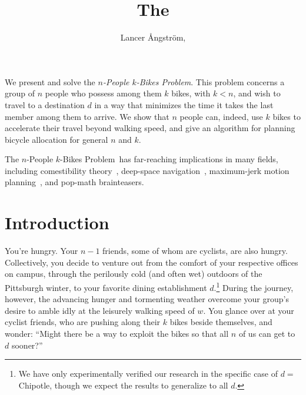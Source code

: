\documentclass[DIV=calc, paper=a4, fontsize=11pt, twocolumn]{scrartcl}	 %
\title{The \Prob} %
\author{Lancer \r{A}ngstr\"{o}m, } %
\date{} %
\newcommand{\initial}[1]{ %
\lettrine[lines=3,lhang=0.3,nindent=0em]{
\color{DarkGoldenrod}
{\textsf{#1}}}{}}
\newcommand\prob{$n$-People $k$-Bikes Problem}
\begin{document}
\maketitle %




\initial{W}e present and solve the {\em \prob}. This problem concerns a group of $n$ people who possess among them $k$ bikes, with $k<n$, and wish to travel to a destination $d$ in a way that minimizes the time it takes the last member among them to arrive. We show that $n$ people can, indeed, use $k$ bikes to accelerate their travel beyond walking speed, and give an algorithm for planning bicycle allocation for general $n$ and $k$.

The \prob~has far-reaching implications in many fields, including comestibility theory~\cite{comestibility}, deep-space navigation~\cite{arkanoid}, maximum-jerk motion planning~\cite{jerk,jerk2}, and pop-math brainteasers.


\section{Introduction}

\initial{Y}ou're hungry. Your $n-1$ friends, some of whom are cyclists, are also hungry. Collectively, you decide to venture out from the comfort of your respective offices on campus, through the perilously cold (and often wet) outdoors of the Pittsburgh winter, to your favorite dining establishment $d$.\footnote{
We have only experimentally verified our research in the specific case of $d =$ {\sf Chipotle}, though we expect the results to generalize to all $d$.}
During the journey, however, the advancing hunger and tormenting weather overcome your group's desire to amble idly at the leisurely walking speed of $w$.
You glance over at your cyclist friends, who are pushing along their $k$ bikes beside themselves, and wonder: ``Might there be a way to exploit the bikes so that all $n$ of us can get to $d$ sooner?''
\end{document}
